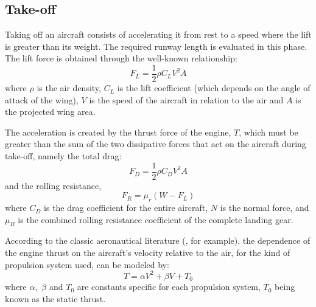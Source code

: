 \documentclass[10pt]{SelfArx} %
\begin{document}
\subsection{Take-off}
Taking off an aircraft consists of accelerating it from rest to a speed where the lift is greater than its weight. The required runway length is evaluated in this phase. The lift force is obtained through the well-known relationship:
\begin{equation} \label{eq:lift}
F_L=\frac{1}{2}\rho C_L V^2 A
\end{equation}
where $\rho$ is the air density, $C_ {L}$ is the lift coefficient (which depends on the angle of attack of the wing), $V$ is the speed of the aircraft in relation to the air and $A$ is the projected wing area. 

The acceleration is created by the thrust force of the engine, $T$, which must be greater than the sum of the two dissipative forces that act on the aircraft during take-off, namely the total drag:
\begin{equation} \label{eq:drag}
F_D=\frac{1}{2}\rho C_{D} V^2 A
\end{equation}
 and the rolling resistance, 
\begin{equation} \label{eq:drag}
F_R=\mu_r(W- F_L) 
\end{equation}
where $C_ {D}$ is the drag coefficient for the entire aircraft, $N$ is the normal force, and $\mu_R$ is the combined rolling resistance coefficient of the complete  landing gear.

According to the classic aeronautical literature (\cite{anderson}, for example), the dependence of the engine thrust on the aircraft's velocity relative to the air, for the kind of propulsion system used, can be modeled by:
\begin{equation} \label{eq:tracao}
T=\alpha V^2 + \beta V + T_0
\end{equation}
where $\alpha,$ $\beta$ and $T_0$ are  constants specific for each propulsion system, $T_0$ being known as the static thrust.
\end{document}

